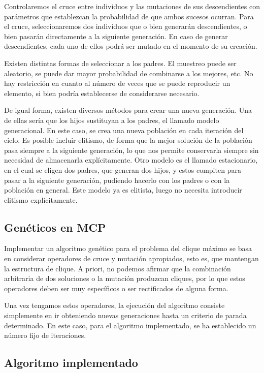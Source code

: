 Controlaremos el cruce entre individuos y las mutaciones de sus descendientes con
parámetros que establezcan la probabilidad de que ambos sucesos ocurran. Para el
cruce, seleccionaremos dos individuos que o bien generarán descendientes, o bien
pasarán directamente a la siguiente generación. En caso de generar descendientes,
cada uno de ellos podrá ser mutado en el momento de su creación.

Existen distintas formas de seleccionar a los padres. El muestreo puede ser aleatorio,
se puede dar mayor probabilidad de combinarse a los mejores, etc. No hay restricción
en cuanto al número de veces que se puede reproducir un elemento, si bien podría
establecerse de considerarse necesario.

De igual forma, existen diversos métodos para crear una nueva generación. Una de
ellas sería que los hijos sustituyan a los padres, el llamado modelo generacional.
En este caso, se crea una nueva población en cada iteración del ciclo. Es posible
incluir elitismo, de forma que la mejor solución de la población pasa siempre a
la siguiente generación, lo que nos permite conservarla siempre sin necesidad de
almacenarla explícitamente. Otro modelo es el llamado estacionario, en el cual
se eligen dos padres, que generan dos hijos, y estos compiten para pasar a la
siguiente generación, pudiendo hacerlo con los padres o con la población en general.
Este modelo ya es elitista, luego no necesita introducir elitismo explícitamente.

\subsection{Genéticos en MCP}

Implementar un algoritmo genético para el problema del clique máximo se basa en
considerar operadores de cruce y mutación apropiados, esto es, que mantengan la
estructura de clique. A priori, no podemos afirmar que la combinación arbitraria
de dos soluciones o la mutación produzcan cliques, por lo que estos operadores
deben ser muy específicos o ser rectificados de alguna forma.

Una vez tengamos estos operadores, la ejecución del algoritmo consiste simplemente
en ir obteniendo nuevas generaciones hasta un criterio de parada determinado.
En este caso, para el algoritmo implementado, se ha establecido un número fijo de
iteraciones.

\subsection{Algoritmo implementado}

